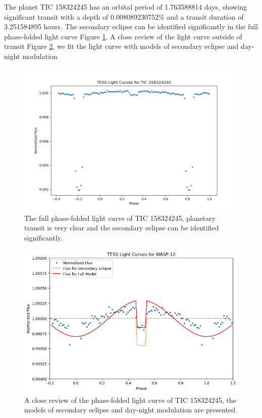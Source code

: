 \documentclass{article}
\begin{document}
The planet TIC 158324245 has an orbital period of 1.763588814 days, showing significant transit with a depth of 0.008089230752\% and a transit duration of 3.251584895 hours. The secondary eclipse can be identified significantly in the full phase-folded light curve Figure \ref{fig:158324245_folded}. A close review of the light curve outside of transit Figure \ref{fig:158324245}, we fit the light curve with models of secondary eclipse and day-night modulation\begin{figure}[H]\centering\includegraphics[width=0.7\linewidth]{image/158324245_folded.png}\captionsetup{font=small} \caption{The full phase-folded light curve of TIC 158324245, planetary transit is very clear and the secondary eclipse can be identified significantly.}\label{fig:158324245_folded}\end{figure}\begin{figure}[H]\centering\includegraphics[width=0.65\linewidth]{image/158324245.png}\captionsetup{font=small} \caption{A close review of the phase-folded light curve of TIC 158324245, the models of secondary eclipse and day-night modulation are presented.}\label{fig:158324245}\end{figure}
\newpage
\end{document}
